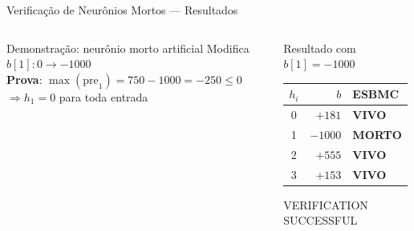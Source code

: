 \documentclass[aspectratio=169]{beamer}
\begin{document}
\begin{frame}[fragile]{Verificação de Neurônios Mortos --- Resultados}
\begin{columns}
    \begin{alertblock}{Demonstração: neurônio morto artificial}
      \small
      Modifica $b[1]: 0 \to -1000$\\[0.1em]
      \textbf{Prova}: $\max(\text{pre}_1)=750-1000=-250\leq 0$\\
      $\Rightarrow h_1=0$ para toda entrada
    \end{alertblock}
    \vspace{0.1em}
    \begin{exampleblock}{Resultado com $b[1]=-1000$}
      \scriptsize
      \begin{tabular}{@{}crl@{}}
        \toprule
        $h_i$ & $b$ & ESBMC \\
        \midrule
        0 & $+181$ & \textcolor{okgreen}{\textbf{VIVO}} \\
        1 & $-1000$ & \textcolor{failred}{\textbf{MORTO}} \\
        2 & $+555$ & \textcolor{okgreen}{\textbf{VIVO}} \\
        3 & $+153$ & \textcolor{okgreen}{\textbf{VIVO}} \\
        \bottomrule
      \end{tabular}
      \quad \textcolor{failred}{VERIFICATION SUCCESSFUL}
    \end{exampleblock}
  \end{columns}
\end{frame}
\end{document}
